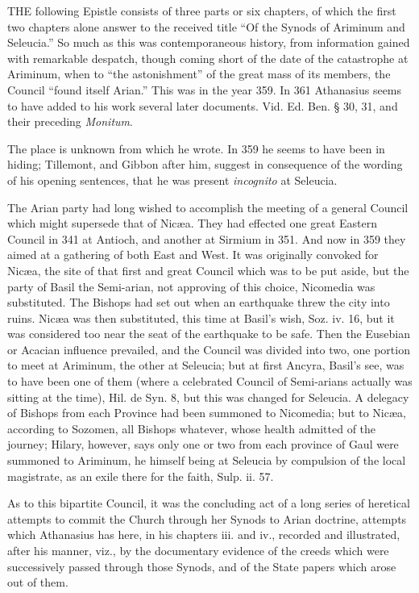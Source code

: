 THE
following Epistle consists of three parts or six chapters, of which
the first two chapters alone answer to the received title ``Of the
Synods of Ariminum and Seleucia.'' So much as this was contemporaneous
history, from information gained with remarkable despatch, though
coming short of the date of the catastrophe at Ariminum, when to ``the
astonishment'' of the great mass of its members, the Council ``found
itself Arian.'' This was in the year 359. In 361 Athanasius seems to
have added to his work several later documents. Vid. Ed. Ben. § 30,
31, and their preceding \emph{Monitum}.

The place is unknown from
which he wrote. In 359 he seems to have been in hiding; Tillemont, and
Gibbon after him, suggest in consequence of the wording of his opening
sentences, that he was present \emph{incognito} at Seleucia.

The Arian party had long
wished to accomplish the meeting of a general Council which might
supersede that of Nicæa. They had effected one great Eastern Council
in 341 at Antioch, and another at Sirmium in 351. And now in 359 they
aimed at a gathering of both East and West. It was originally convoked
for Nicæa, the site of that first and great Council which was to be
put aside, but the party of Basil the Semi-arian, not approving of
this choice, Nicomedia was substituted. The Bishops had set out when
an earthquake threw the city into ruins. Nicæa was then substituted,
this time at Basil's wish, Soz. iv. 16, but it was considered too near
the seat of the earthquake to be safe. Then the Eusebian or
Acacian influence prevailed, and the Council was divided into two, one
portion to meet at Ariminum, the other at Seleucia; but at first
Ancyra, Basil's see, was to have been one of them (where a celebrated
Council of Semi-arians actually was sitting at the time), Hil. de Syn.
8, but this was changed for Seleucia. A delegacy of Bishops from each
Province had been summoned to Nicomedia; but to Nicæa, according to
Sozomen, all Bishops whatever, whose health admitted of the journey;
Hilary, however, says only one or two from each province of Gaul were
summoned to Ariminum, he himself being at Seleucia by compulsion of
the local magistrate, as an exile there for the faith, Sulp. ii. 57.

As to this bipartite Council,
it was the concluding act of a long series of heretical attempts to
commit the Church through her Synods to Arian doctrine, attempts which
Athanasius has here, in his chapters iii. and iv., recorded and
illustrated, after his manner, viz., by the documentary evidence of
the creeds which were successively passed through those Synods, and of
the State papers which arose out of them.

